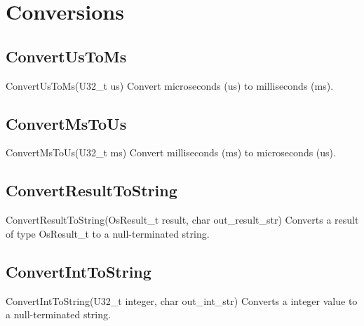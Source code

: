 \chapter{Conversions}

\section{ConvertUsToMs}
\label{func:ConvertUsToMs}
\begin{pdfunction}
{ConvertUsToMs(U32\_t us) }
{ 
Convert microseconds (us) to milliseconds (ms). }
\end{pdfunction}

\section{ConvertMsToUs}
\label{func:ConvertMsToUs}
\begin{pdfunction}
{ConvertMsToUs(U32\_t ms) }
{ 
Convert milliseconds (ms) to microseconds (us). }
\end{pdfunction}

\section{ConvertResultToString}
\label{func:ConvertResultToString}
\begin{pdfunction}
{ConvertResultToString(OsResult\_t result,  char out\_result\_str) }
{ 
Converts a result of type OsResult\_t to a null-terminated 
string.}
\end{pdfunction}

\section{ConvertIntToString}
\label{func:ConvertIntToString}
\begin{pdfunction}
{ConvertIntToString(U32\_t integer, char out\_int\_str) }
{ 
Converts a integer value to a null-terminated string. }
\end{pdfunction}

